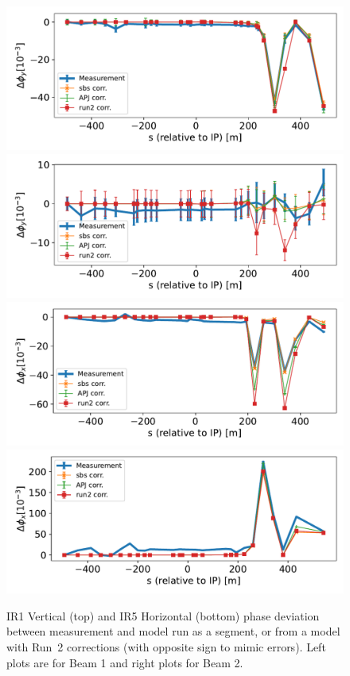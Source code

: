\documentclass{cernatsnote}
\begin{document}
\begin{figure}
  \includegraphics[width=0.5\linewidth]{local_corr/beam1_y_IP1.pdf}  
  \includegraphics[width=0.5\linewidth]{local_corr/beam2_y_IP1.pdf}  
  \includegraphics[width=0.5\linewidth]{local_corr/beam1_x_IP5.pdf}  
  \includegraphics[width=0.5\linewidth]{local_corr/beam2_x_IP5.pdf}  
\caption{IR1 Vertical (top) and IR5 Horizontal (bottom) phase deviation between measurement and model run as a segment, or from a model with Run~2 corrections (with opposite sign to mimic errors). Left plots are for Beam 1 and right plots for Beam 2.}
\label{fig:local_ip15}
\end{figure}
\end{document}

